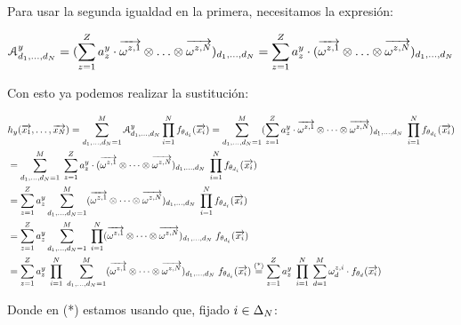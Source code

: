 Para usar la segunda igualdad en la primera, necesitamos la expresión:

\begin{equation}
	\mathcal{A}^y_{d_1, \ldots, d_N} = (\sum_{z = 1}^Z a_z^y \cdot \nv{\omega^{z, 1}} \otimes \ldots \otimes \nv{\omega^{z, N}})_{d_1, \ldots, d_N} = \sum_{z = 1}^Z a_z^y \cdot (\nv{\omega^{z, 1}} \otimes \ldots \otimes \nv{\omega^{z, N}})_{d_1, \ldots, d_N}
\end{equation}

Con esto ya podemos realizar la sustitución:

\begin{equation}
	\begin{split}
        &h_y(\nv{x_1}, \ldots, \nv{x_N}) = \sum_{d_1, \ldots, d_N = 1}^{M} \mathcal{A}^y_{d_1, \ldots, d_N} \prod_{i = 1}^N f_{\theta_{d_i}}(\nv{x_i}) = \sum_{d_1, \ldots, d_N = 1}^{M} (\sum_{z = 1}^Z a_z^y \cdot \nv{\omega^{z, 1}} \otimes \cdots \otimes \nv{\omega^{z, N}})_{d_1, \ldots, d_N} \; \prod_{i = 1}^N f_{\theta_{d_i}}(\nv{x_i}) \\
        &= \sum_{d_1, \ldots, d_N = 1}^{M} \; \sum_{z = 1}^Z a_z^y \cdot (\nv{\omega^{z, 1}} \otimes \cdots \otimes \nv{\omega^{z, N}})_{d_1, \ldots, d_N} \; \prod_{i = 1}^N f_{\theta_{d_i}}(\nv{x_i}) \\
        &= \sum_{z = 1}^Z a_z^y \sum_{d_1, \ldots, d_N = 1}^{M}  (\nv{\omega^{z, 1}} \otimes \cdots \otimes \nv{\omega^{z, N}})_{d_1, \ldots, d_N} \; \prod_{i = 1}^N f_{\theta_{d_i}}(\nv{x_i}) \\
        &= \sum_{z = 1}^Z a_z^y \sum_{d_1, \ldots, d_N = 1}^{M} \; \prod_{i = 1}^N (\nv{\omega^{z, 1}} \otimes \cdots \otimes \nv{\omega^{z, N}})_{d_1, \ldots, d_N}  \; f_{\theta_{d_i}}(\nv{x_i}) \\
        &= \sum_{z = 1}^Z a_z^y \; \prod_{i = 1}^N \; \sum_{d_1, \ldots, d_N = 1}^{M}  (\nv{\omega^{z, 1}} \otimes \cdots \otimes \nv{\omega^{z, N}})_{d_1, \ldots, d_N} \; f_{\theta_{d_i}}(\nv{x_i}) \encima{=}{\text{(*)}} \sum_{z = 1}^Z a_z^y \; \prod_{i = 1}^N \; \sum_{d = 1}^{M} \omega_d^{z,i}  \cdot f_{\theta_{d}}(\nv{x_i})
	\end{split}
\end{equation}

Donde en (*) estamos usando que, fijado $i \in \deltaset{N}$:

